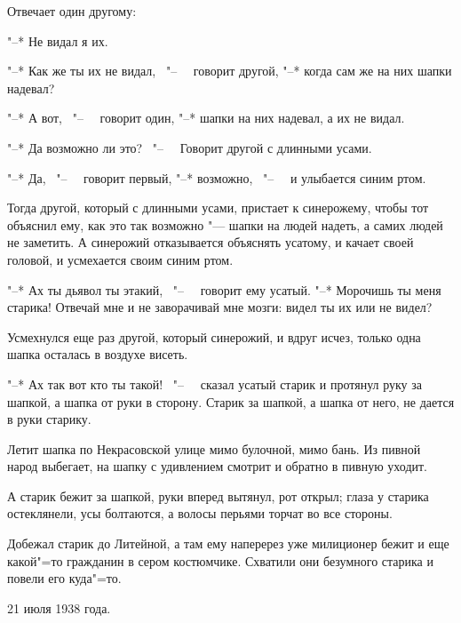     Отвечает один другому:
    
    "--* Не видал я их.
    
    "--* Как же ты их не видал, \ "--~ \ говорит другой, "--* когда сам же на них шапки надевал?

    "--* А вот, \ "--~ \ говорит один, "--* шапки на них надевал, а их не видал.

    "--* Да возможно ли это? \ "--~ \ Говорит другой с длинными усами.

    "--* Да, \ "--~ \ говорит первый, "--* возможно, \ "--~ \ и улыбается синим ртом.

    Тогда другой, который с длинными усами, пристает к синерожему, чтобы тот объяснил ему, как это так возможно "--- шапки на людей надеть, а самих людей не заметить. А синерожий отказывается объяснять усатому, и качает своей головой, и усмехается своим синим ртом.

    "--* Ах ты дьявол ты этакий, \ "--~ \ говорит ему усатый. "--* Морочишь ты меня старика! Отвечай мне и не заворачивай мне мозги: видел ты их или не видел?

    Усмехнулся еще раз другой, который синерожий, и вдруг исчез, только одна шапка осталась в воздухе висеть.

    "--* Ах так вот кто ты такой! \ "--~ \ сказал усатый старик и протянул руку за шапкой, а шапка от руки в сторону. Старик за шапкой, а шапка от него, не дается в руки старику.

    Летит шапка по Некрасовской улице мимо булочной, мимо бань. Из пивной народ выбегает, на шапку с удивлением смотрит и обратно в пивную уходит.

    А старик бежит за шапкой, руки вперед вытянул, рот открыл; глаза у старика остеклянели, усы болтаются, а волосы перьями торчат во все стороны.

    Добежал  старик до Литейной,  а  там ему наперерез уже милиционер бежит и еще  какой"=то гражданин в сером костюмчике.  Схватили они безумного старика и повели его куда"=то.
    
\begin{flushright}
21 июля 1938 года.
\end{flushright}
